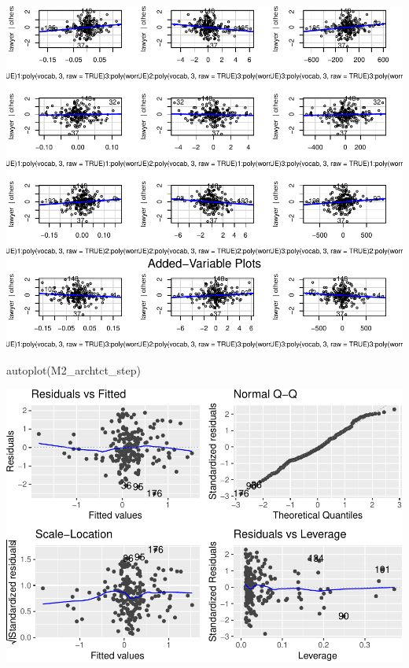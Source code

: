 \documentclass[
]{article}
\newenvironment{Shaded}{\begin{snugshade}}{\end{snugshade}}
\newcommand{\FunctionTok}[1]{\textcolor[rgb]{0.00,0.00,0.00}{#1}}
\newcommand{\NormalTok}[1]{#1}
\begin{document}
\includegraphics{HW5-Trinath-Sai-Subhash-Reddy-Pittala_files/figure-latex/unnamed-chunk-22-8.pdf}
\includegraphics{HW5-Trinath-Sai-Subhash-Reddy-Pittala_files/figure-latex/unnamed-chunk-22-9.pdf}

\begin{Shaded}
\begin{Highlighting}[]
\FunctionTok{autoplot}\NormalTok{(M2\_archtct\_step)}
\end{Highlighting}
\end{Shaded}

\includegraphics{HW5-Trinath-Sai-Subhash-Reddy-Pittala_files/figure-latex/unnamed-chunk-23-1.pdf}
\end{document}
